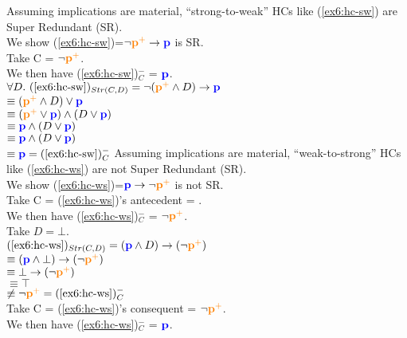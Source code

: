 \begin{exe}
	\ex\label{ex6:hc-sw-sr} {Assuming implications are material, ``strong-to-weak'' HCs like (\ref{ex6:hc-sw}) are Super Redundant (SR).\\
		We show (\ref{ex6:hc-sw})=$\neg\textbf{\textcolor{orange}{p$^+$}}\rightarrow\textbf{\textcolor{blue}{p}}$ is SR.\\
		Take C = $\neg\textbf{\textcolor{orange}{p$^+$}}$.\\
		We then have (\ref{ex6:hc-sw})$^-_C$ = $\textbf{\textcolor{blue}{p}}$.\\
		$\forall D. \ (\textref{ex6:hc-sw})_{Str(C, D)} = \neg(\pplus \wedge D) \rightarrow \p$\\
		 $\equiv (\textbf{\textcolor{orange}{p$^+$}} \wedge D) \vee \textbf{\textcolor{blue}{p}}$\\
		 $\equiv (\textbf{\textcolor{orange}{p$^+$}} \vee \textbf{\textcolor{blue}{p}}) \wedge (D \vee \textbf{\textcolor{blue}{p}})$\\
		 $\equiv \textbf{\textcolor{blue}{p}} \wedge (D \vee \textbf{\textcolor{blue}{p}})$\\
		 $\equiv \textbf{\textcolor{blue}{p}} \wedge (D \vee \textbf{\textcolor{blue}{p}})$\\
		 $\equiv \p = (\textref{ex6:hc-sw})^-_C$ 
	}
	\ex\label{ex6:hc-ws-sr} {Assuming implications are material, ``weak-to-strong'' HCs like (\ref{ex6:hc-ws}) are not Super Redundant (SR).\\
		We show (\ref{ex6:hc-ws})=$\textbf{\textcolor{blue}{p}}\rightarrow\neg\textbf{\textcolor{orange}{p$^+$}}$ is not SR.\\
		Take C = (\ref{ex6:hc-ws})'s antecedent = \p.\\
		We then have (\ref{ex6:hc-ws})$^-_C$ = $\neg\textbf{\textcolor{orange}{p$^+$}}$.\\
		Take $D=\bot$.\\
		$(\textref{ex6:hc-ws})_{Str(C, D)} =  (\p \wedge D) \rightarrow (\neg\pplus) $\\
		 $\equiv (\textbf{\textcolor{blue}{p}} \wedge \bot) \rightarrow (\neg\textbf{\textcolor{orange}{p$^+$}})$\\
		 $\equiv \bot \rightarrow (\neg\textbf{\textcolor{orange}{p$^+$}})$\\
		 $\equiv \top$\\  $\not\equiv \neg\pplus = (\textref{ex6:hc-ws})^-_C$\\
		Take C = (\ref{ex6:hc-ws})'s consequent = $\neg\textbf{\textcolor{orange}{p$^+$}}$.\\
		We then have (\ref{ex6:hc-ws})$^-_C$ = $\textbf{\textcolor{blue}{p}}$.\\
}
\end{exe}
